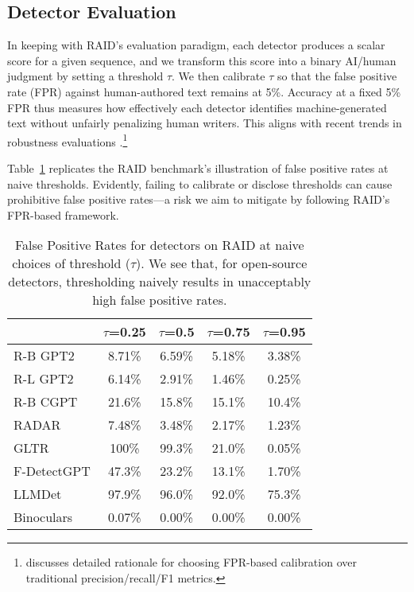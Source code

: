 \subsection{Detector Evaluation}
In keeping with RAID’s evaluation paradigm, each detector produces a scalar score for a given sequence, and we transform this score into a binary AI/human judgment by setting a threshold $\tau$. We then calibrate $\tau$ so that the false positive rate (FPR) against human-authored text remains at 5\%. Accuracy at a fixed 5\% FPR thus measures how effectively each detector identifies machine-generated text without unfairly penalizing human writers. This aligns with recent trends in robustness evaluations \citep{hans2024spotting, krishna2023paraphrasing, soto2024fewshot}.\footnote{\citet{dugan2024raidsharedbenchmarkrobust} discusses detailed rationale for choosing FPR-based calibration over traditional precision/recall/F1 metrics.}

Table~\ref{tab:fpr_results} replicates the RAID benchmark’s illustration of false positive rates at naive thresholds. Evidently, failing to calibrate or disclose thresholds can cause prohibitive false positive rates—a risk we aim to mitigate by following RAID’s FPR-based framework.


\begin{table}[t]
    \small
    \centering
    \begin{tabular}{l|c|c|c|c}
    \toprule
    &$\tau$=0.25&$\tau$=0.5&$\tau$=0.75&$\tau$=0.95\\
    \midrule
    R-B GPT2&8.71\%&6.59\%&5.18\%&3.38\%\\
    R-L GPT2&6.14\%&2.91\%&1.46\%&0.25\%\\
    R-B CGPT&21.6\%&15.8\%&15.1\%&10.4\%\\
    RADAR&7.48\%&3.48\%&2.17\%&1.23\%\\
    \midrule
    GLTR&100\%&99.3\%&21.0\%&0.05\%\\
    F-DetectGPT&47.3\%&23.2\%&13.1\%&1.70\%\\
    LLMDet&97.9\%&96.0\%&92.0\%&75.3\%\\
    Binoculars&0.07\%&0.00\%&0.00\%&0.00\%\\
    \bottomrule
    \end{tabular}
    \caption{False Positive Rates for detectors on RAID at naive choices of threshold ($\tau$). We see that, for open-source detectors, thresholding naively results in unacceptably high false positive rates.}
    \label{tab:fpr_results}
\end{table}

